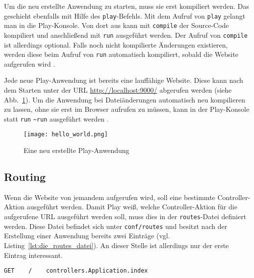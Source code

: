 Um die neu erstellte Anwendung zu starten, muss sie erst kompiliert werden.
Das geschieht ebenfalls mit Hilfe des \lstinline|play|-Befehls.
Mit dem Aufruf von \lstinline|play| gelangt man in die Play-Konsole.
Von dort aus kann mit \lstinline|compile| der Source-Code kompiliert und anschließend mit \lstinline|run| ausgeführt werden.
Der Aufruf von \lstinline|compile| ist allerdings optional.
Falls noch nicht kompilierte Änderungen existieren, werden diese beim Aufruf von \lstinline|run| automatisch kompiliert, sobald die Website aufgerufen wird \cite[vgl.][]{play_compile}.

Jede neue Play-Anwendung ist bereits eine lauffähige Website.
Diese kann nach dem Starten unter der URL \url{http://localhost:9000/} abgerufen werden (siehe Abb.~\ref{fig:anwendung_nach_erstellung}).
Um die Anwendung bei Dateiänderungen automatisch neu kompilieren zu lassen, ohne sie erst im Browser aufrufen zu müssen, kann in der Play-Konsole statt \lstinline|run| \lstinline|~run| ausgeführt werden \cite[vgl.][S.~12]{play_for_scala}.

\begin{figure}
\centering
\texttt{[image: hello\_world.png]}
\caption{Eine neu erstellte Play-Anwendung}
\label{fig:anwendung_nach_erstellung}
\end{figure}



\subsection{Routing} %
\label{sub:routing}

Wenn die Website von jemandem aufgerufen wird, soll eine bestimmte Controller-Aktion ausgeführt werden.
Damit Play weiß, welche Controller-Aktion für die aufgerufene URL ausgeführt werden soll, muss dies in der \lstinline|routes|-Datei definiert werden.
Diese Datei befindet sich unter \lstinline|conf/routes| und besitzt nach der Erstellung einer Anwendung bereits zwei Einträge (vgl. Listing~\ref{lst:die_routes_datei}).
An dieser Stelle ist allerdings nur der erste Eintrag interessant.

\begin{lstlisting}[caption=Die routes-Datei, label=lst:die_routes_datei]
  GET    /    controllers.Application.index
\end{lstlisting}

